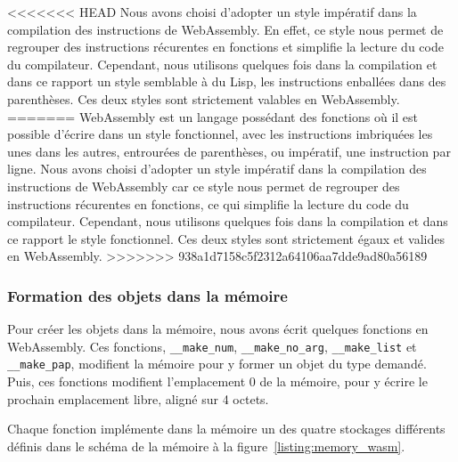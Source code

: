 \documentclass{rapportECL}
\begin{document}
<<<<<<< HEAD
Nous avons choisi d'adopter un style impératif dans la compilation des instructions de WebAssembly. En effet, ce style nous permet 
de regrouper des instructions récurentes en fonctions et simplifie la lecture du code du compilateur. Cependant, nous utilisons
quelques fois dans la compilation et dans ce rapport un style semblable à du Lisp, les instructions enballées dans des parenthèses.
Ces deux styles sont strictement valables en WebAssembly.
=======
WebAssembly est un langage possédant des fonctions où il est possible d'écrire dans un style fonctionnel, avec les instructions 
imbriquées les unes dans les autres, entrourées de parenthèses, ou impératif, une instruction par ligne.
Nous avons choisi d'adopter un style impératif dans la compilation des instructions de WebAssembly car ce style nous permet 
de regrouper des instructions récurentes en fonctions, ce qui simplifie la lecture du code du compilateur. Cependant, nous utilisons
quelques fois dans la compilation et dans ce rapport le style fonctionnel.
Ces deux styles sont strictement égaux et valides en WebAssembly.
>>>>>>> 938a1d7158c5f2312a64106aa7dde9ad80a56189

\subsubsection{Formation des objets dans la mémoire}

Pour créer les objets dans la mémoire, nous avons écrit quelques fonctions en WebAssembly.
Ces fonctions, \verb|__make_num|, \verb|__make_no_arg|, \verb|__make_list| et \verb|__make_pap|, modifient la mémoire
pour y former un objet du type demandé. Puis, ces fonctions modifient l'emplacement 0 de la mémoire, pour y écrire le
prochain emplacement libre, aligné sur 4 octets. 

Chaque fonction implémente dans la mémoire un des quatre stockages différents définis dans le schéma de la 
mémoire à la figure~\ref{listing:memory_wasm}.

\medskip


\end{document}
